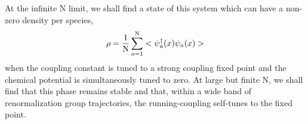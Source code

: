 \documentclass[twocolumn,secnumarabic,amssymb, nobibnotes, aps, prd]{revtex4}
\begin{document}
At the infinite N limit, we shall find a state of this system which  can have a non-zero density per species, 
\begin{equation}\label{rho}
\rho = \frac{1}{{\rm  N}}\sum_{a=1}^{\rm  N}<\psi_a^\dagger(x)\psi_a(x)>
\end{equation}
when the coupling constant
is tuned to a strong coupling fixed point and the chemical potential is simultaneously tuned to zero.  
At large but finite N, we shall find that this
phase remains stable and that, within a wide band of renormalization group trajectories, 
 the running-coupling self-tunes to the fixed point.   
\end{document}
